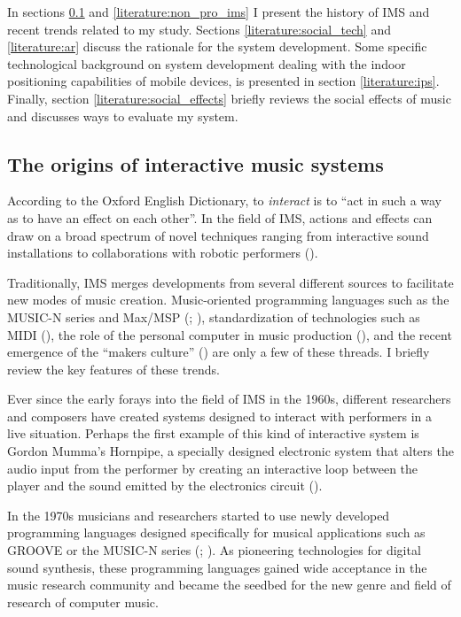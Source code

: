 \documentclass[a4paper,11pt]{article}
\begin{document}
In sections \ref{literature:ims} and \ref{literature:non_pro_ims} I present the history of IMS and recent trends related to my study.
Sections \ref{literature:social_tech} and \ref{literature:ar} discuss the rationale for the system development.
Some specific technological background on system development dealing with the indoor positioning capabilities of mobile devices, is presented in section \ref{literature:ips}.
Finally, section \ref{literature:social_effects} briefly reviews the social effects of music and discusses ways to evaluate my system.

\subsection{The origins of interactive music systems} \label{literature:ims}

According to the Oxford English Dictionary, to \emph{interact} is to ``act in such a way as to have an effect on each other''.
In the field of IMS, actions and effects can draw on a broad spectrum of novel techniques ranging from interactive sound installations to collaborations with robotic performers (\cite{drummond09}).

Traditionally, IMS merges developments from several different sources to facilitate new modes of music creation.
Music-oriented programming languages such as the MUSIC-N series and Max/MSP (\cite{mathews69}; \cite[p. 16]{winkler01}), standardization of technologies such as MIDI (\cite{web:quinn}), the role of the personal computer in music production (\cite{leider:04}), and the recent emergence of the ``makers culture'' (\cite{kuznetsov2010rise}) are only a few of these threads.
I briefly review the key features of these trends.

Ever since the early forays into the field of IMS in the 1960s, different researchers and composers have created systems designed to interact with performers in a live situation.
Perhaps the first example of this kind of interactive system is Gordon Mumma's Hornpipe, a specially designed electronic system that alters the audio input from the performer by creating an interactive loop between the player and the sound emitted by the electronics circuit (\cite[p. 12]{winkler01}).

In the 1970s musicians and researchers started to use newly developed programming languages designed specifically for musical applications such as GROOVE or the MUSIC-N series (\cite{mathews70}; \cite{mathews69}).
As pioneering technologies for digital sound synthesis, these programming languages gained wide acceptance in the music research community and became the seedbed for the new genre and field of research of computer music.
\end{document}
